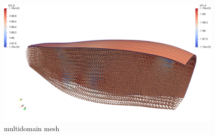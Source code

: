 \begin{figure}[H]
  \centering%
  \includegraphics[width=\textwidth]{images/results/application/multidomain_mesh.png}%
  \caption{multidomain mesh}%
  \label{fig:multidomain_mesh}%
\end{figure}



